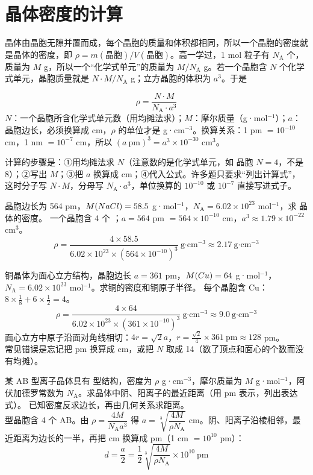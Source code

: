 \section{晶体密度的计算}

晶体由晶胞无隙并置而成，每个晶胞的质量和体积都相同，所以一个晶胞的密度就是晶体的密度，即 $\rho=m(\text{晶胞})/V(\text{晶胞})$。高一学过，1 mol 粒子有 $N_\text{A}$ 个，质量为 $M$ g，所以一个“化学式单元”的质量为 $M/N_\text{A}$ g。若一个晶胞含 $N$ 个化学式单元，晶胞质量就是 $N\cdot M/N_\text{A}$ g；立方晶胞的体积为 $a^3$。于是

\begin{gainian}[晶胞密度公式]
\[
\rho=\frac{N\cdot M}{N_\text{A}\cdot a^3}
\]
$N$：一个晶胞所含化学式单元数（用均摊法求）；$M$：摩尔质量（g·mol$^{-1}$）；$a$：晶胞边长，必须换算成 cm，$\rho$ 的单位才是 g·cm$^{-3}$。换算关系：1 pm $=10^{-10}$ cm，1 nm $=10^{-7}$ cm，所以 $(a\ \text{pm})^3=a^3\times10^{-30}$ cm$^3$。
\end{gainian}

计算的步骤是：①用均摊法求 $N$（注意数的是化学式单元，如  晶胞 $N=4$，不是 8）；②写出 $M$；③把 $a$ 换算成 cm；④代入公式。许多题只要求“列出计算式”，这时分子写 $N\cdot M$，分母写 $N_\text{A}\cdot a^3$，单位换算的 $10^{-10}$ 或 $10^{-7}$ 直接写进式子。

\begin{liti}[基础练习]
 晶胞边长为 564 pm，$M(NaCl)=58.5$ g·mol$^{-1}$，$N_\text{A}=6.02\times10^{23}$ mol$^{-1}$，求  晶体的密度。
\tcblower
\jie 一个晶胞含 4 个 ；$a=564$ pm $=564\times10^{-10}$ cm，$a^3\approx1.79\times10^{-22}$ cm$^3$。
\[\rho=\frac{4\times58.5}{6.02\times10^{23}\times(564\times10^{-10})^3}\ \text{g·cm}^{-3}\approx2.17\ \text{g·cm}^{-3}\]
\end{liti}

\begin{liti}[典型练习]
铜晶体为面心立方结构，晶胞边长 $a=361$ pm，$M(Cu)=64$ g·mol$^{-1}$，$N_\text{A}=6.02\times10^{23}$ mol$^{-1}$。求铜的密度和铜原子半径。
\tcblower
\jie 每个晶胞含 Cu：$8\times\frac18+6\times\frac12=4$。
\[\rho=\frac{4\times64}{6.02\times10^{23}\times(361\times10^{-10})^3}\ \text{g·cm}^{-3}\approx9.0\ \text{g·cm}^{-3}\]
面心立方中原子沿面对角线相切：$4r=\sqrt2a$，$r=\frac{\sqrt2}{4}\times361\ \text{pm}\approx128$ pm。\\
\xianjing 常见错误是忘记把 pm 换算成 cm，或把 $N$ 取成 14（数了顶点和面心的个数而没有均摊）。
\end{liti}

\begin{liti}[综合练习]
某 AB 型离子晶体具有  型结构，密度为 $\rho$ g·cm$^{-3}$，摩尔质量为 $M$ g·mol$^{-1}$，阿伏加德罗常数为 $N_\text{A}$。求晶体中阴、阳离子的最近距离（用 pm 表示，列出表达式）。
\tcblower
\silu 已知密度反求边长，再由几何关系求距离。\\
\jie {} 型晶胞含 4 个 AB。由 $\rho=\dfrac{4M}{N_\text{A}a^3}$ 得 $a=\sqrt[3]{\dfrac{4M}{\rho N_\text{A}}}$ cm。阴、阳离子沿棱相邻，最近距离为边长的一半，再把 cm 换算成 pm（1 cm $=10^{10}$ pm）：
\[d=\frac a2=\frac12\sqrt[3]{\frac{4M}{\rho N_\text{A}}}\times10^{10}\ \text{pm}\]
\end{liti}

